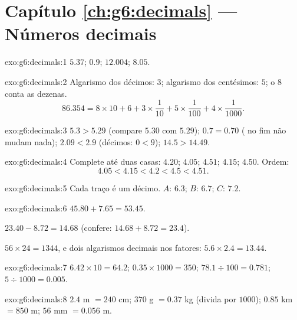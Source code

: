 \section*{Capítulo \ref{ch:g6:decimals} --- Números decimais}

\begin{solution}{exo:g6:decimals:1}
$5.37$; \quad $0.9$; \quad $12.004$; \quad $8.05$.
\end{solution}

\begin{solution}{exo:g6:decimals:2}
Algarismo dos décimos: $3$; algarismo dos centésimos: $5$; o $8$ conta
as dezenas.
\[
86.354 = 8 \times 10 + 6 + 3 \times \frac{1}{10} + 5 \times
\frac{1}{100} + 4 \times \frac{1}{1000}.
\]
\end{solution}

\begin{solution}{exo:g6:decimals:3}
$5.3 > 5.29$ (compare $5.30$ com $5.29$); \quad
$0.7 = 0.70$ ( no fim não mudam nada); \quad
$2.09 < 2.9$ (décimos: $0 < 9$); \quad
$14.5 > 14.49$.
\end{solution}

\begin{solution}{exo:g6:decimals:4}
Complete até duas casas: $4.20$; $4.05$; $4.51$; $4.15$; $4.50$. Ordem:
\[
4.05 < 4.15 < 4.2 < 4.5 < 4.51 .
\]
\end{solution}

\begin{solution}{exo:g6:decimals:5}
Cada traço é um décimo. $A$: $6.3$; \quad $B$: $6.7$; \quad
$C$: $7.2$.
\end{solution}

\begin{solution}{exo:g6:decimals:6}
$45.80 + 7.65 = 53.45$.

$23.40 - 8.72 = 14.68$ (confere: $14.68 + 8.72 = 23.4$).

$56 \times 24 = 1344$, e dois algarismos decimais nos fatores:
$5.6 \times 2.4 = 13.44$.
\end{solution}

\begin{solution}{exo:g6:decimals:7}
$6.42 \times 10 = 64.2$; \quad
$0.35 \times 1000 = 350$; \quad
$78.1 \div 100 = 0.781$; \quad
$5 \div 1000 = 0.005$.
\end{solution}

\begin{solution}{exo:g6:decimals:8}
$2.4$ m $= 240$ cm; \quad $370$ g $= 0.37$ kg (divida por $1000$);
\quad $0.85$ km $= 850$ m; \quad $56$ mm $= 0.056$ m.
\end{solution}

